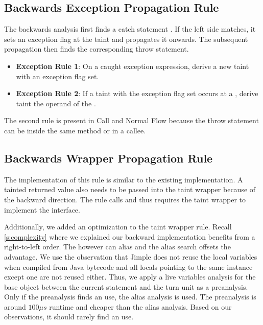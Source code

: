 \documentclass[../draft.tex]{subfiles}
\begin{document}
    \subsection{Backwards Exception Propagation Rule}
    The backwards analysis first finds a catch statement . 
    If the left side matches, it sets an exception flag at the taint and propagates it onwards. 
    The subsequent propagation then finds the corresponding throw statement.
    \begin{itemize}
        \item \textbf{Exception Rule 1}: On a caught exception expression, derive a new taint with an exception flag set.
        \item \textbf{Exception Rule 2}: If a taint with the exception flag set occurs at a , derive taint the operand of the . 
    \end{itemize}
    The second rule is present in Call and Normal Flow because the throw statement can be inside the same method or in a callee.

    \subsection{Backwards Wrapper Propagation Rule}
    The implementation of this rule is similar to the existing implementation. 
    A tainted returned value also needs to be passed into the taint wrapper because of the backward direction. 
    The rule calls  and thus requires the taint wrapper to implement the  interface.
    
    Additionally, we added an optimization to the taint wrapper rule. 
    Recall \autoref{s:complexity} where we explained our backward implementation benefits from a right-to-left order. 
    The  however can alias and the alias search offsets the advantage. 
    We use the observation that Jimple does not reuse the local variables when compiled from Java bytecode and all locals pointing to the same  instance except one are not reused either.
    Thus, we apply a live variables analysis for the base object between the current statement and the turn unit as a preanalysis. 
    Only if the preanalysis finds an use, the alias analysis is used. 
    The preanalysis is around $100\mu s$ runtime and cheaper than the alias analysis.
    Based on our observations, it should rarely find an use.
\end{document}
